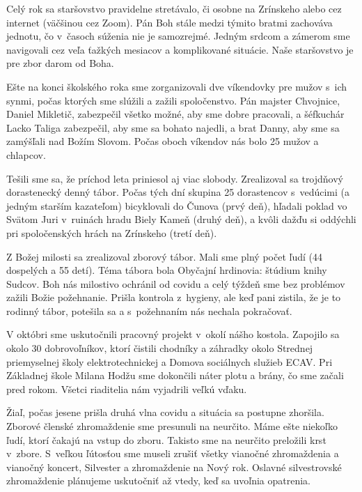 Celý rok sa staršovstvo pravidelne stretávalo, či osobne na Zrínskeho alebo cez internet (väčšinou cez Zoom). Pán Boh stále medzi týmito bratmi zachováva jednotu, čo v~časoch súženia nie je samozrejmé. Jedným srdcom a zámerom sme navigovali cez veľa ťažkých mesiacov a komplikované situácie. Naše staršovstvo je pre zbor darom od Boha.

Ešte na konci školského roka sme zorganizovali dve víkendovky pre mužov s~ich synmi, počas ktorých sme slúžili a zažili spoločenstvo. Pán majster Chvojnice, Daniel Mikletič, zabezpečil všetko možné, aby sme dobre pracovali, a šéfkuchár Lacko Taliga zabezpečil, aby sme sa bohato najedli, a brat Danny, aby sme sa zamýšľali nad Božím Slovom. Počas oboch víkendov nás bolo 25 mužov a chlapcov.

Tešili sme sa, že príchod leta priniesol aj viac slobody. Zrealizoval sa trojdňový dorastenecký denný tábor. Počas tých dní skupina 25 dorastencov s~vedúcimi (a jedným starším kazateľom) bicyklovali do Čunova (prvý deň), hľadali poklad vo Svätom Juri v~ruinách hradu Biely Kameň (druhý deň), a kvôli dažďu si oddýchli pri spoločenských hrách na Zrínskeho (tretí deň).

Z Božej milosti sa zrealizoval zborový tábor. Mali sme plný počet ľudí (44 dospelých a 55 detí). Téma tábora bola Obyčajní hrdinovia: štúdium knihy Sudcov. Boh nás milostivo ochránil od covidu a celý týždeň sme bez problémov zažili Božie požehnanie. Prišla kontrola z~hygieny, ale keď pani zistila, že je to rodinný tábor, potešila sa a s~požehnaním nás nechala pokračovať.

V októbri sme uskutočnili pracovný projekt v~okolí nášho kostola. Zapojilo sa okolo 30 dobrovoľníkov, ktorí čistili chodníky a záhradky okolo Strednej priemyselnej školy elektrotechnickej a Domova sociálnych služieb ECAV. Pri Základnej škole Milana Hodžu sme dokončili náter plotu a brány, čo sme začali pred rokom. Všetci riaditelia nám vyjadrili veľkú vďaku.

Žiaľ, počas jesene prišla druhá vlna covidu a situácia sa postupne zhoršila.  Zborové členské zhromaždenie sme presunuli na neurčito. Máme ešte niekoľko ľudí, ktorí čakajú na vstup do zboru. Takisto sme na neurčito preložili krst v~zbore. S~veľkou ľútosťou sme museli zrušiť všetky vianočné zhromaždenia a vianočný koncert, Silvester a zhromaždenie na Nový rok. Oslavné silvestrovské zhromaždenie plánujeme uskutočniť až vtedy, keď sa uvoľnia opatrenia.



